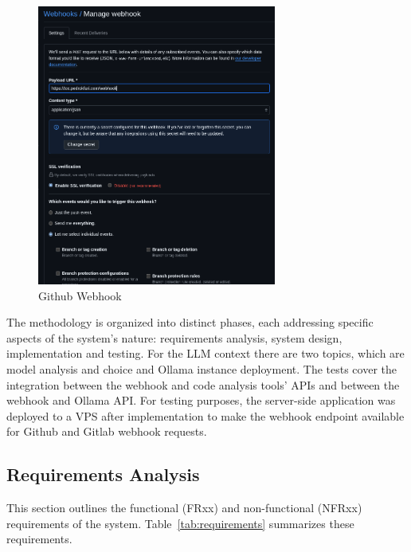 \documentclass[12pt]{article}
\begin{document}
\begin{figure}[htbp]
    \centering
    \includegraphics[width=0.7\textwidth]{webhook-github.png}
    \caption{Github Webhook}
    \label{fig:githubwh}
\end{figure}

The methodology is organized into distinct phases, each addressing specific aspects of the system's nature: requirements analysis, system design, implementation and testing. For the LLM context there are two topics, which are model analysis and choice and Ollama instance deployment. The tests cover the integration between the webhook and code analysis tools' APIs and between the webhook and Ollama API. For testing purposes, the server-side application was deployed to a VPS after implementation to make the webhook endpoint available for Github and Gitlab webhook requests. 

\subsection{Requirements Analysis}
This section outlines the functional (FRxx) and non-functional (NFRxx) requirements of the system. Table~\ref{tab:requirements} summarizes these requirements.
\end{document}
